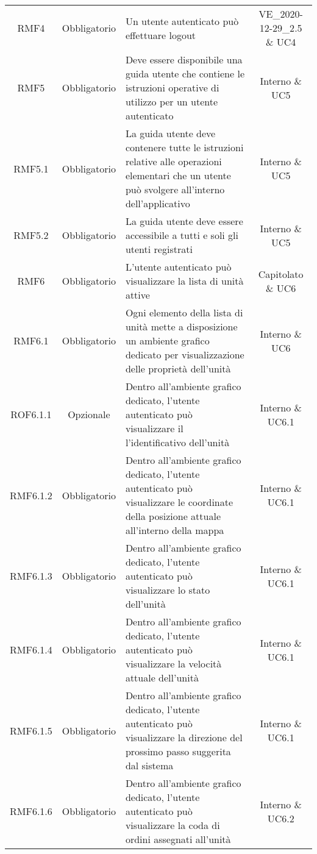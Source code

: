 \begin{longtable}[h!] { c c m{8cm} c}
		RMF4 & Obbligatorio & Un utente autenticato può effettuare logout & VE_2020-12-29_2.5 \& UC4 \\

		RMF5 & Obbligatorio & Deve essere disponibile una guida utente che contiene le istruzioni operative di utilizzo per un utente autenticato & Interno \& UC5 \\

		RMF5.1 & Obbligatorio & La guida utente deve contenere tutte le istruzioni relative alle operazioni elementari che un utente può svolgere all'interno dell'applicativo & Interno \& UC5 \\

		RMF5.2 & Obbligatorio & La guida utente deve essere accessibile a tutti e soli gli utenti registrati & Interno \& UC5 \\

		RMF6 & Obbligatorio & L'utente autenticato può visualizzare la lista di unità attive & Capitolato \& UC6 \\

		RMF6.1 & Obbligatorio & Ogni elemento della lista di unità mette a disposizione un ambiente grafico dedicato per visualizzazione delle proprietà dell'unità & Interno \& UC6 \\

		ROF6.1.1 & Opzionale & Dentro all'ambiente grafico dedicato, l'utente autenticato può visualizzare il l'identificativo dell'unità & Interno \& UC6.1 \\

		RMF6.1.2 & Obbligatorio & Dentro all'ambiente grafico dedicato, l'utente autenticato può visualizzare le coordinate della posizione attuale all'interno della mappa & Interno \& UC6.1 \\

		RMF6.1.3 & Obbligatorio &  Dentro all'ambiente grafico dedicato, l'utente autenticato può visualizzare lo stato dell'unità & Interno \& UC6.1 \\

		RMF6.1.4 & Obbligatorio &  Dentro all'ambiente grafico dedicato, l'utente autenticato può visualizzare la velocità attuale dell'unità & Interno \& UC6.1 \\

		RMF6.1.5 & Obbligatorio &  Dentro all'ambiente grafico dedicato, l'utente autenticato può visualizzare la direzione del prossimo passo suggerita dal sistema & Interno \& UC6.1 \\

		RMF6.1.6 & Obbligatorio &  Dentro all'ambiente grafico dedicato, l'utente autenticato può visualizzare la coda di ordini assegnati all'unità & Interno \& UC6.2 \\


\end{longtable}
